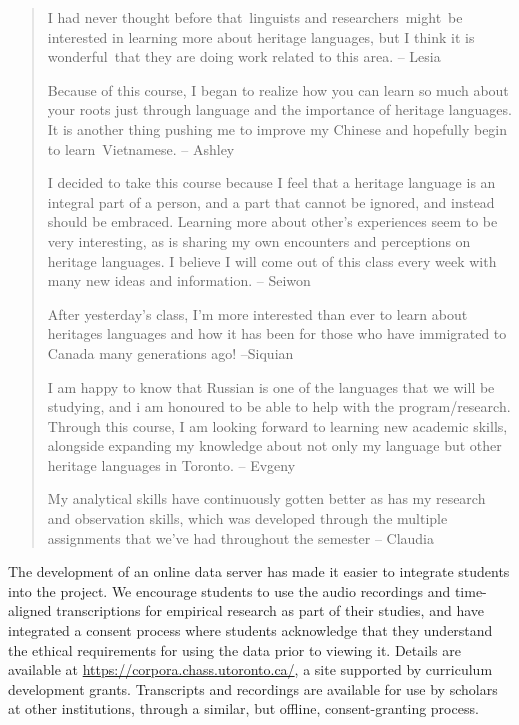 \documentclass[output=paper]{LSP/langsci}
\begin{document}
\begin{quote}
I had never thought before that~linguists and researchers~might~be interested in learning more about heritage languages, but I think it is wonderful~that they are doing work related to this area. – Lesia

Because of this course, I began to realize how you can learn so much about your roots just through language and the importance of heritage languages. It is another thing pushing me to improve my Chinese and hopefully begin to learn~Vietnamese. – Ashley

 I decided to take this course because I feel that a heritage language is an integral part of a person, and a part that cannot be ignored, and instead should be embraced. Learning more about other’s experiences seem to be very interesting, as is sharing my own encounters and perceptions on heritage languages. I believe I will come out of this class every week with many new ideas and information. – Seiwon

After yesterday's class, I'm more interested than ever to learn about heritages languages and how it has been for those who have immigrated to Canada many generations ago! –Siquian

I am happy to know that Russian is one of the languages that we will be studying, and i am honoured to be able to help with the program/research. Through this course, I am looking forward to learning new academic skills, alongside expanding my knowledge about not only my language but other heritage languages in Toronto. – Evgeny

My analytical skills have continuously gotten better as has my research and observation skills, which was developed through the multiple assignments that we've had throughout the semester – Claudia
\end{quote}

The development of an online data server has made it easier to integrate students into the project. We encourage students to use the audio recordings and time-aligned transcriptions for empirical research as part of their studies, and have integrated a consent process where students acknowledge that they understand the ethical requirements for using the data prior to viewing it. Details are available at \url{https://corpora.chass.utoronto.ca/}, a site supported by curriculum development grants. Transcripts and recordings are available for use by scholars at other institutions, through a similar, but offline, consent-granting process.
\end{document}
